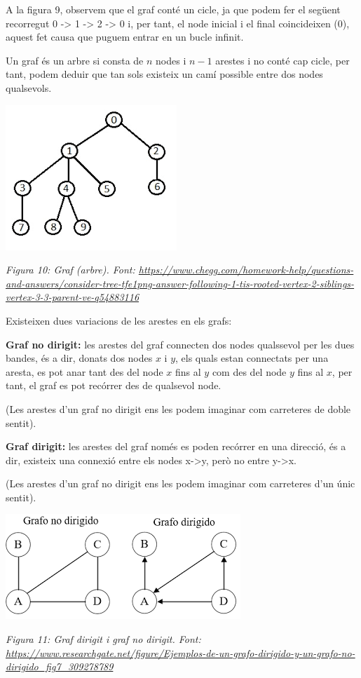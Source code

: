 A la figura 9, observem que el graf conté un cicle, ja que podem fer el següent recorregut 0 -> 1 -> 2 -> 0 i, per tant, el node inicial i el final coincideixen (0), aquest fet causa que puguem entrar en un bucle infinit. \newline \newline

Un graf és un arbre si consta de $n$ nodes i $n-1$ arestes i no conté cap cicle, per tant, podem deduir que tan sols existeix un camí possible entre dos nodes qualsevols.

\begin{center}
    \includegraphics[width=.4 \textwidth]{TreeRoot.png}

    \caption{\emph{Figura 10: Graf (arbre). Font: \url{https://www.chegg.com/homework-help/questions-and-answers/consider-tree-tfe1png-answer-following-1-tis-rooted-vertex-2-siblings-vertex-3-3-parent-ve-q54883116}}}
\end{center}

Existeixen dues variacions de les arestes en els grafs: \newline

\textbf{Graf no dirigit:} les arestes del graf connecten dos nodes qualssevol per les dues bandes, és a dir, donats dos nodes $x$ i $y$, els quals estan connectats per una aresta, es pot anar tant des del node $x$ fins al $y$ com des del node $y$ fins al $x$, per tant, el graf es pot recórrer des de qualsevol node.

(Les arestes d'un graf no dirigit ens les podem imaginar com carreteres de doble sentit).
\newline

\textbf{Graf dirigit:} les arestes del graf només es poden recórrer en una direcció, és a dir, existeix una connexió entre els nodes x->y, però no entre y->x.

(Les arestes d'un graf no dirigit ens les podem imaginar com carreteres d'un únic sentit).

\begin{center}
    \includegraphics[width=.7 \textwidth]{GrafDir.png}
    
    \caption{\emph{Figura 11: Graf dirigit i graf no dirigit. Font: \url{https://www.researchgate.net/figure/Ejemplos-de-un-grafo-dirigido-y-un-grafo-no-dirigido_fig7_309278789}}}
\end{center}

